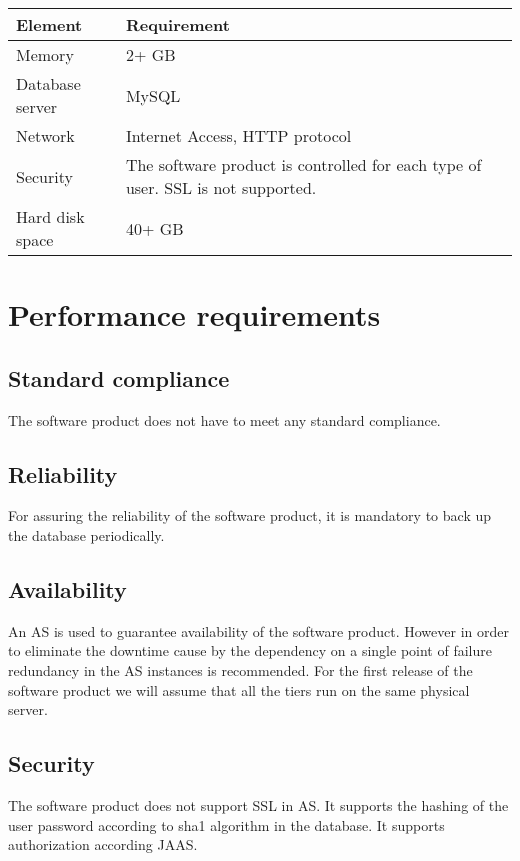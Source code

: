 \documentclass[a4paper,12pt]{book}
\begin{document}
\begin{center}
  \begin{tabular}{ | p{5cm} | p{10cm} | }
    \hline
    \textbf{Element} & \textbf{Requirement} \\ \hline
    Memory & 2+ GB \\ \hline
    Database server & MySQL \\ \hline
    Network & Internet Access, HTTP protocol \\ \hline
    Security & The software product is controlled for each type of user. SSL is not supported. \\ \hline
    Hard disk space & 40+ GB \\ \hline
  \end{tabular}
\end{center}

\section{Performance requirements}

\subsection{Standard compliance}
The software product does not have to meet any standard compliance.

\subsection{Reliability}
For assuring the reliability of the software product, it is mandatory to back up the database periodically.

\subsection{Availability}
An AS is used to guarantee availability of the software product. However in order to eliminate the downtime cause by the dependency on a single point of failure redundancy in the AS instances is recommended. For the first release of the software product we will assume that all the tiers run on the same physical server.

\subsection{Security}
The software product does not support SSL in AS. It supports the hashing of the user password according to sha1 algorithm in the database. It supports authorization according JAAS.
\end{document}
